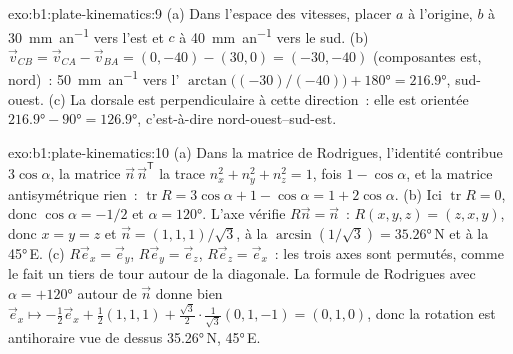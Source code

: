 \begin{solution}{exo:b1:plate-kinematics:9}
(a) Dans l'espace des vitesses, placer $a$ à l'origine, $b$ à \qty{30}{mm.an^{-1}} vers
l'est et $c$ à \qty{40}{mm.an^{-1}} vers le sud. (b) $\vec v_{CB} =
\vec v_{CA} - \vec v_{BA} = (0, -40) - (30, 0) = (-30, -40)$ (composantes est,
nord)~: \qty{50}{mm.an^{-1}} vers l'
$\arctan\bigl((-30)/(-40)\bigr) + \ang{180} = \ang{216.9}$, sud-ouest. (c) La
dorsale est perpendiculaire à cette direction~: elle est orientée
$\ang{216.9} - \ang{90} = \ang{126.9}$, c'est-à-dire nord-ouest--sud-est.
\end{solution}

\begin{solution}{exo:b1:plate-kinematics:10}
(a) Dans la matrice de Rodrigues, l'identité contribue $3\cos\alpha$, la matrice
$\vec n\,\vec n^{\mathsf T}$ la trace $n_x^2 + n_y^2 + n_z^2 = 1$, fois
$1 - \cos\alpha$, et la matrice antisymétrique rien~: $\operatorname{tr}R =
3\cos\alpha + 1 - \cos\alpha = 1 + 2\cos\alpha$. (b) Ici $\operatorname{tr}R = 0$,
donc $\cos\alpha = -1/2$ et $\alpha = \ang{120}$. L'axe vérifie $R\vec n =
\vec n$~: $R(x, y, z) = (z, x, y)$, donc $x = y = z$ et $\vec n =
(1, 1, 1)/\sqrt3$, à la  $\arcsin(1/\sqrt3) = \ang{35.26}$\,N et à la
 \ang{45}\,E. (c) $R\vec e_x = \vec e_y$, $R\vec e_y = \vec e_z$,
$R\vec e_z = \vec e_x$~: les trois axes sont permutés, comme le fait un tiers de tour autour de
la diagonale. La formule de Rodrigues avec $\alpha = +\ang{120}$ autour de $\vec n$
donne bien $\vec e_x\mapsto -\tfrac12\vec e_x + \tfrac12(1, 1, 1) +
\tfrac{\sqrt3}{2}\cdot\tfrac{1}{\sqrt3}(0, 1, -1) = (0, 1, 0)$, donc la rotation
est antihoraire vue de dessus \ang{35.26}\,N, \ang{45}\,E.
\end{solution}

